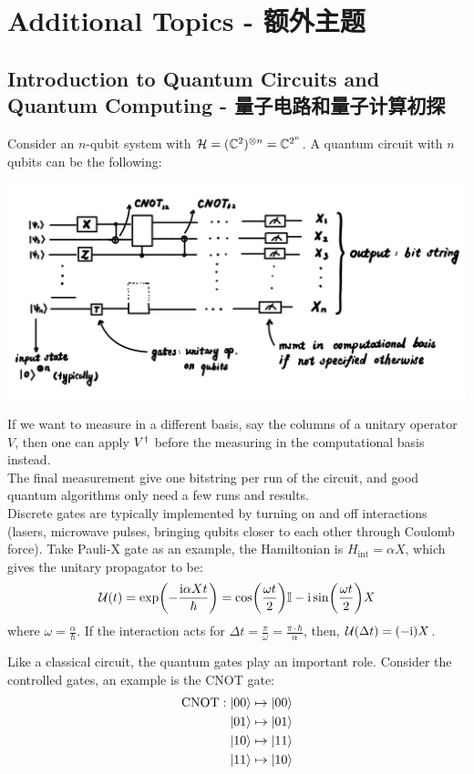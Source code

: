 \section{Additional Topics - 额外主题}
\subsection{Introduction to Quantum Circuits and Quantum Computing - 量子电路和量子计算初探}
Consider an $n$-qubit system with $\mathcal{H} = (\mathbb{C}^2)^{\otimes n} = \mathbb{C}^{2^n}$. A quantum circuit with $n$ qubits can be the following:
\begin{center}
    \includegraphics[scale = 0.6]{qcircuit.png}
\end{center}
If we want to measure in a different basis, say the columns of a unitary operator $V$, then one can apply $V^{\dagger}$ before the measuring in the computational basis instead. \\
The final measurement give one bitstring per run of the circuit, and good quantum algorithms only need a few runs and results. \\
Discrete gates are typically implemented by turning on and off interactions (lasers, microwave pulses, bringing qubits closer to each other through Coulomb force). Take Pauli-X gate as an example, the Hamiltonian is $H_{\text{int}} = \alpha X$, which gives the unitary propagator to be:
$$\mathcal{U}(t) = \exp(-\frac{\mathrm{i} \alpha X t}{\hbar}) = \cos(\frac{\omega t}{2})\mathbb{I} - \mathrm{i} \sin(\frac{\omega t}{2})X$$
where $\omega = \frac{\alpha}{\hbar}$. If the interaction acts for $\Delta t = \frac{\pi}{\omega} = \frac{\pi \cdot \hbar}{\alpha}$, then, $\mathcal{U}(\Delta t) = (-\mathrm{i})X$. \par
Like a classical circuit, the quantum gates play an important role. Consider the controlled gates, an example is the CNOT gate:
\begin{align*}
    \text{CNOT}: \ket{00} &\mapsto \ket{00} \\\
    \ket{01} &\mapsto \ket{01} \\
    \ket{10} &\mapsto \ket{11} \\
    \ket{11} &\mapsto \ket{10}
\end{align*}
